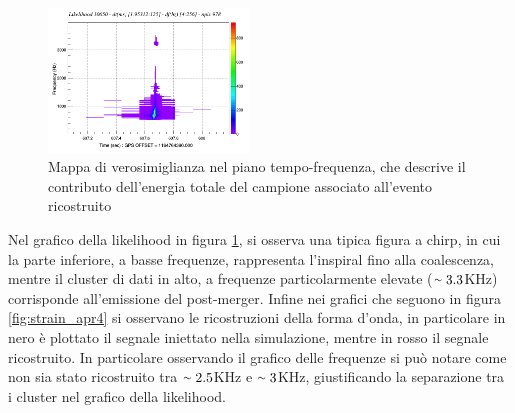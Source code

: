 \begin{figure}
	\vspace{-35pt}
	\begin{center}
		\includegraphics[width=0.475\textwidth]{figures/Capitolo_3/APR4_q09/l_tfmap_scalogram.png}
	\end{center}
	\vspace{-5pt}
	\caption{Mappa di verosimiglianza nel piano tempo-frequenza, che descrive il contributo dell'energia totale del campione associato all'evento ricostruito}
	\label{fig:Likelihood_APR4}
	\vspace{-10pt}
\end{figure}
Nel grafico della likelihood in figura \ref{fig:Likelihood_APR4}, si osserva una tipica figura a chirp, in cui la parte inferiore, a basse frequenze, rappresenta l'inspiral fino alla coalescenza, mentre il cluster di dati in alto, a frequenze particolarmente elevate ($\smallsim 3.3$KHz) corrisponde all'emissione del post-merger.
Infine nei grafici che seguono in figura \ref{fig:strain_apr4} si osservano le ricostruzioni della forma d'onda, in particolare in nero è plottato il segnale iniettato nella simulazione, mentre in rosso il segnale ricostruito. In particolare osservando il grafico delle frequenze si può notare come non sia stato ricostruito tra $\smallsim2.5$KHz e $\smallsim3$KHz, giustificando la separazione tra i cluster nel grafico della likelihood.
